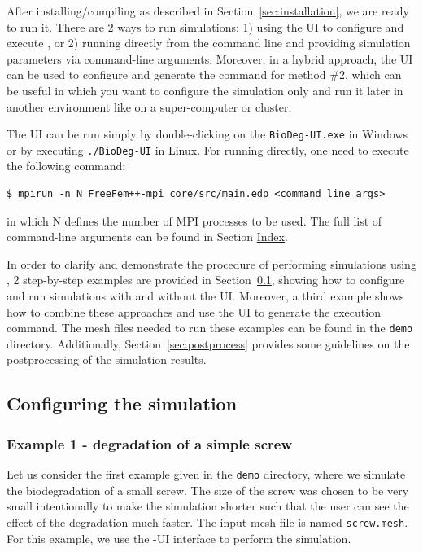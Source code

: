 After installing/compiling \biodeg{} as described in Section~\ref{sec:installation}, we are ready to run it. There are 2 ways to run \biodeg{} simulations: 1) using the UI to configure and execute \biodeg{}, or 2) running \biodeg{} directly from the command line and providing simulation parameters via command-line arguments. Moreover, in a hybrid approach, the UI can be used to configure and generate the command for method \#2, which can be useful in which you want to configure the simulation only and run it later in another environment like on a super-computer or cluster.

The UI can be run simply by double-clicking on the \verb|BioDeg-UI.exe| in Windows or by executing \verb|./BioDeg-UI| in Linux. For running \biodeg{} directly, one need to execute the following command:
\begin{verbatim}
$ mpirun -n N FreeFem++-mpi core/src/main.edp <command line args>
\end{verbatim}
in which N defines the number of MPI processes to be used. The full list of command-line arguments can be found in Section \hyperref[sec:index]{Index}.

In order to clarify and demonstrate the procedure of performing simulations using \biodeg{}, 2 step-by-step examples are provided in Section~\ref{sec:config}, showing how to configure and run simulations with and without the UI. Moreover, a third example shows how to combine these approaches and use the UI to generate the execution command. The mesh files needed to run these examples can be found in the \verb|demo| directory. Additionally, Section~\ref{sec:postprocess} provides some guidelines on the postprocessing of the  \biodeg{} simulation results. 

\subsection{Configuring the simulation} \label{sec:config}


\subsubsection{Example 1 - degradation of a simple screw}\label{sec:example1}

Let us consider the first example given in the \verb|demo| directory, where we simulate the biodegradation of a small screw. The size of the screw was chosen to be very small intentionally to make the simulation shorter such that the user can see the effect of the degradation much faster. The input mesh file is named \verb|screw.mesh|. For this example, we use the \biodeg{}-UI interface to perform the simulation. 

